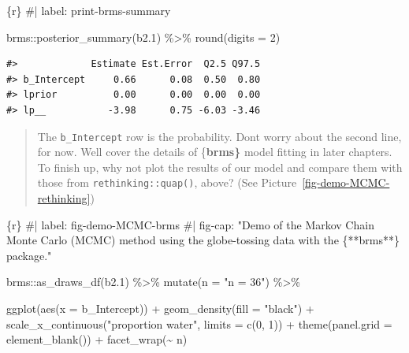 \documentclass[
  letterpaper,
  DIV=11,
  numbers=noendperiod]{scrreprt}
\newenvironment{Shaded}{\begin{snugshade}}{\end{snugshade}}
\newcommand{\AttributeTok}[1]{\textcolor[rgb]{0.40,0.45,0.13}{#1}}
\newcommand{\CommentTok}[1]{\textcolor[rgb]{0.37,0.37,0.37}{#1}}
\newcommand{\DecValTok}[1]{\textcolor[rgb]{0.68,0.00,0.00}{#1}}
\newcommand{\FloatTok}[1]{\textcolor[rgb]{0.68,0.00,0.00}{#1}}
\newcommand{\FunctionTok}[1]{\textcolor[rgb]{0.28,0.35,0.67}{#1}}
\newcommand{\InformationTok}[1]{\textcolor[rgb]{0.37,0.37,0.37}{#1}}
\newcommand{\NormalTok}[1]{\textcolor[rgb]{0.00,0.23,0.31}{#1}}
\newcommand{\SpecialCharTok}[1]{\textcolor[rgb]{0.37,0.37,0.37}{#1}}
\newcommand{\StringTok}[1]{\textcolor[rgb]{0.13,0.47,0.30}{#1}}
\begin{document}
\begin{Shaded}
\begin{Highlighting}[]
\InformationTok{\textasciigrave{}\textasciigrave{}\textasciigrave{}\{r\}}
\CommentTok{\#| label: print{-}brms{-}summary}

\NormalTok{brms}\SpecialCharTok{::}\FunctionTok{posterior\_summary}\NormalTok{(b2}\FloatTok{.1}\NormalTok{) }\SpecialCharTok{\%\textgreater{}\%} 
  \FunctionTok{round}\NormalTok{(}\AttributeTok{digits =} \DecValTok{2}\NormalTok{)}
\InformationTok{\textasciigrave{}\textasciigrave{}\textasciigrave{}}
\end{Highlighting}
\end{Shaded}

\begin{verbatim}
#>             Estimate Est.Error  Q2.5 Q97.5
#> b_Intercept     0.66      0.08  0.50  0.80
#> lprior          0.00      0.00  0.00  0.00
#> lp__           -3.98      0.75 -6.03 -3.46
\end{verbatim}

\begin{quote}
The \texttt{b\_Intercept} row is the probability. Don\textquotesingle t
worry about the second line, for now. We\textquotesingle ll cover the
details of \{\textbf{brms\}} model fitting in later chapters. To finish
up, why not plot the results of our model and compare them with those
from \texttt{rethinking::quap()}, above? (See
Picture~\ref{fig-demo-MCMC-rethinking})
\end{quote}

\begin{Shaded}
\begin{Highlighting}[]
\InformationTok{\textasciigrave{}\textasciigrave{}\textasciigrave{}\{r\}}
\CommentTok{\#| label: fig{-}demo{-}MCMC{-}brms}
\CommentTok{\#| fig{-}cap: "Demo of the Markov Chain Monte Carlo (MCMC) method using the globe{-}tossing data with the \{**brms**\} package."}

\NormalTok{brms}\SpecialCharTok{::}\FunctionTok{as\_draws\_df}\NormalTok{(b2}\FloatTok{.1}\NormalTok{) }\SpecialCharTok{\%\textgreater{}\%} 
  \FunctionTok{mutate}\NormalTok{(}\AttributeTok{n =} \StringTok{"n = 36"}\NormalTok{) }\SpecialCharTok{\%\textgreater{}\%}
  
  \FunctionTok{ggplot}\NormalTok{(}\FunctionTok{aes}\NormalTok{(}\AttributeTok{x =}\NormalTok{ b\_Intercept)) }\SpecialCharTok{+}
  \FunctionTok{geom\_density}\NormalTok{(}\AttributeTok{fill =} \StringTok{"black"}\NormalTok{) }\SpecialCharTok{+}
  \FunctionTok{scale\_x\_continuous}\NormalTok{(}\StringTok{"proportion water"}\NormalTok{, }\AttributeTok{limits =} \FunctionTok{c}\NormalTok{(}\DecValTok{0}\NormalTok{, }\DecValTok{1}\NormalTok{)) }\SpecialCharTok{+}
  \FunctionTok{theme}\NormalTok{(}\AttributeTok{panel.grid =} \FunctionTok{element\_blank}\NormalTok{()) }\SpecialCharTok{+}
  \FunctionTok{facet\_wrap}\NormalTok{(}\SpecialCharTok{\textasciitilde{}}\NormalTok{ n)}
\InformationTok{\textasciigrave{}\textasciigrave{}\textasciigrave{}}
\end{Highlighting}
\end{Shaded}
\end{document}
